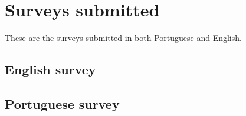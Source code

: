 \chapter{Surveys submitted}

These are the surveys submitted in both Portuguese and English.

\section{ English survey}
\label{appendix:a1}



\section{ Portuguese survey}
\label{appendix:a2}


